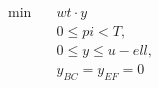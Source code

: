 \begin{align}
  \min\quad & wt \cdot y \tag{eq\_0002} \\
  & 0 \leq \mathit{pi} < T , \tag{eq\_0005} \\
  & 0 \leq y \leq u - \mathit{ell} , \tag{eq\_0011} \\
  & y_{B C} = y_{E F} = 0 \tag{eq\_0019\_c} \\
\end{align}
